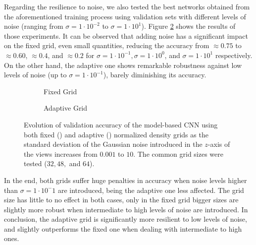 Regarding the resilience to noise, we also tested the best networks obtained from the aforementioned training process using validation sets with different levels of noise (ranging from $\sigma=1\cdot10^{-2}$ to $\sigma=1\cdot10^1$). Figure \ref{subfig:objrecog:3dcnn:experiments:25d_adaptive_density_noise} shows the results of those experiments. It can be observed that adding noise has a significant impact on the fixed grid, even small quantities, reducing the accuracy from $\approx0.75$ to $\approx0.60$, $\approx0.4$, and $\approx0.2$ for $\sigma=1\cdot10^{-1}, \sigma=1\cdot{10^0}$, and $\sigma=1\cdot10^1$ respectively. On the other hand, the adaptive one shows remarkable robustness against low levels of noise (up to $\sigma=1\cdot10^{-1}$), barely diminishing its accuracy.

\begin{figure}[!t]
	\centering
	\begin{subfigure}{0.49\textwidth}
		
		\caption{Fixed Grid}
		\label{subfig:objrecog:3dcnn:experiments:25d_fixed_density_noise}
	\end{subfigure}
	\begin{subfigure}{0.49\textwidth}
		
		\caption{Adaptive Grid}
		\label{subfig:objrecog:3dcnn:experiments:25d_adaptive_density_noise}
	\end{subfigure}
	\caption{Evolution of validation accuracy of the model-based \acs{CNN} using both fixed () and adaptive () normalized density grids as the standard deviation of the Gaussian noise introduced in the $z$-axis of the views increases from $0.001$ to $10$. The common grid sizes were tested ($32, 48, $ and $64$).}
	\label{fig:objrecog:3dcnn:experiments:25d_density_noise}
\end{figure}

In the end, both grids suffer huge penalties in accuracy when noise levels higher than $\sigma=1\cdot10^-1$ are introduced, being the adaptive one less affected. The grid size has little to no effect in both cases, only in the fixed grid bigger sizes are slightly more robust when intermediate to high levels of noise are introduced. In conclusion, the adaptive grid is significantly more resilient to low levels of noise, and slightly outperforms the fixed one when dealing with intermediate to high ones.

